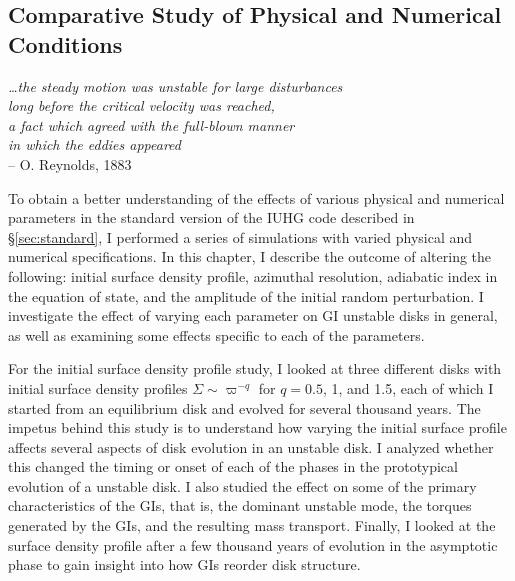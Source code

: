 \begin{spacing}{1.0}
\chapter[Comparative Study of Conditions]{Comparative Study of Physical and Numerical Conditions}\label{chap:compare}
\end{spacing}
\thispagestyle{plain}
\begin{spacing}{0.9}
\begin{flushright}
{\it \footnotesize \ldots the steady motion was unstable for large disturbances\\ long before the critical velocity was reached,\\ a fact which agreed with the full-blown manner\\ in which the eddies appeared\\}
 {\small -- O. Reynolds, 1883}
\end{flushright}
\end{spacing}
To obtain a better understanding of the effects of various physical and numerical parameters in the standard version of the IUHG code described in \S \ref{sec:standard}, I performed a series of simulations with varied physical and numerical specifications. In this chapter, I describe the outcome of altering the following: initial surface density profile, azimuthal resolution, adiabatic index in the equation of state, and the amplitude of the initial random perturbation. I investigate the effect of varying each parameter on GI unstable disks in general, as well as examining some effects specific to each of the parameters. 

For the initial surface density profile study, I looked at three different disks with initial surface density profiles $\Sigma \sim \varpi^{-q}$ for $q = 0.5$, 1, and 1.5, each of which I started from an equilibrium disk and evolved for several thousand years. The impetus behind this study is to understand how varying the initial surface profile affects several aspects of disk evolution in an unstable disk. I analyzed whether this changed the timing or onset of each of the phases in the prototypical evolution of a unstable disk. I also studied the effect on some of the primary characteristics of the GIs, that is, the dominant unstable mode, the torques generated by the GIs, and the resulting mass transport. Finally, I looked at the surface density profile after a few thousand years of evolution in the asymptotic phase to gain insight into how GIs reorder disk structure. 

